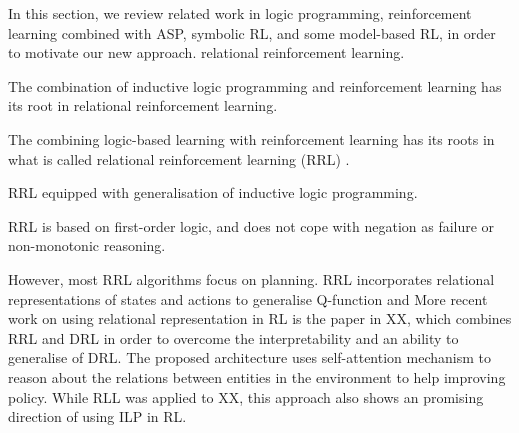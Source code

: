 In this section, we review related work in logic programming, reinforcement learning combined with ASP, symbolic RL, and some model-based RL, in order to motivate our new approach.
relational reinforcement learning.

The combination of inductive logic programming and reinforcement learning has its root in relational reinforcement learning. 

The combining logic-based learning with reinforcement learning has its roots in what is called relational reinforcement learning (RRL) \cite{Dzeroski2001}. 

RRL equipped with generalisation of inductive logic programming. 

RRL is based on first-order logic, and does not cope with negation as failure or non-monotonic reasoning.

However, most RRL algorithms focus on planning. 
RRL incorporates relational representations of states and actions to generalise Q-function and 
More recent work on using relational representation in RL is the paper in XX, which combines RRL and DRL in order to overcome the interpretability and an ability to generalise of DRL.
The proposed architecture uses self-attention mechanism to reason about the relations between entities in the environment to help improving policy. 
While RLL was applied to XX, this approach also shows an promising direction of using ILP in RL.



